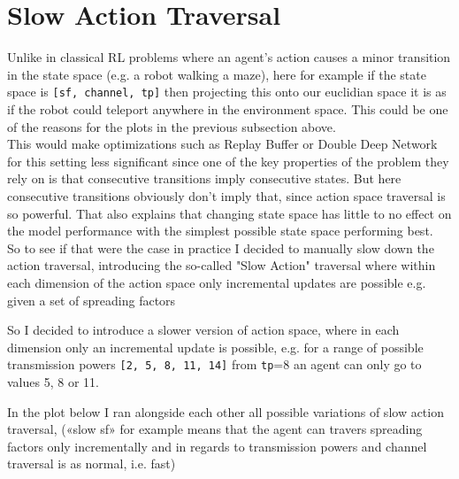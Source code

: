 

\section{Slow Action Traversal}

Unlike in classical RL problems where an agent's action causes
a minor transition in the state space 
(e.g. a robot walking a maze), here for example if 
the state space is \texttt{[sf, channel, tp]} then 
projecting this onto our euclidian space it is as if the 
robot could teleport anywhere in the environment space. 
This could be one of the reasons for the plots in the previous 
subsection above.\\

This would make optimizations such as Replay Buffer or 
Double Deep Network for this setting less significant since one
of the key properties of the problem they rely on is that
consecutive transitions imply consecutive states. But here
consecutive transitions obviously don't imply that, since
action space traversal is so powerful. That also explains
that changing state space has little to no effect on the model
performance with the simplest possible state space performing 
best. \\

So to see if that were the case in practice I decided to
manually slow down the action traversal, introducing the 
so-called "Slow Action" traversal where within each dimension 
of the action space only incremental updates are possible e.g.
given a set of spreading factors

So I decided to introduce a slower version of action space,
where in each dimension only an incremental update is possible, e.g. for a range of possible transmission powers 
\texttt{[2, 5, 8, 11, 14]} from \texttt{tp}=8 an agent can
only go to values 5, 8 or 11.

In the plot below I ran alongside each other all possible 
variations of slow action traversal, («slow sf» for example
means that the agent can travers spreading factors only incrementally and in regards to transmission powers and channel
traversal is as normal, i.e. fast)

